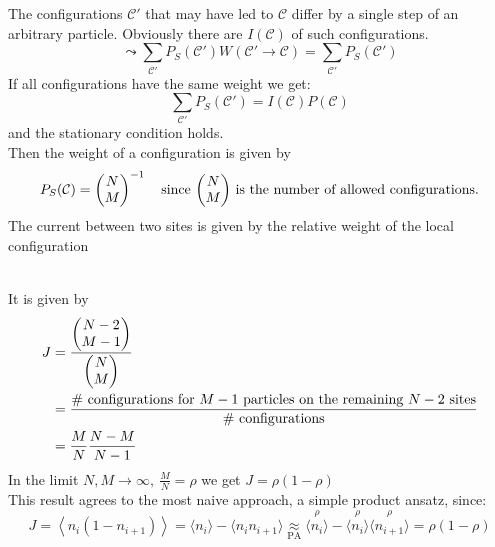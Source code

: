 The configurations $\mathcal{C}'$ that may have led to $\mathcal{C}$ differ by a single step of an arbitrary particle. Obviously there are $I(\mathcal{C})$ of such configurations.
\begin{equation*}
	\leadsto \sum\limits_{\mathcal{C}'}P_S(\mathcal{C}')W(\mathcal{C}'\to\mathcal{C})=\sum\limits_{\mathcal{C}'}P_S(\mathcal{C}')
\end{equation*}
If all configurations have the same weight we get:
\begin{equation*}
	\sum\limits_{\mathcal{C}'} P_S(\mathcal{C}') = I(\mathcal{C})P(\mathcal{C})
\end{equation*}
and the stationary condition holds.\\
Then the weight of a configuration is given by
\begin{equation*}
	P_S(\mathcal{C})=\begin{pmatrix} N\\ M\end{pmatrix}^{-1} \quad\text{since $\begin{pmatrix} N \\ M \end{pmatrix}$ is the number of allowed configurations.}
\end{equation*}
The current between two sites is given by the relative weight of the local configuration \\
It is given by
\begin{align*}
	J&=\frac{\begin{pmatrix} N-2 \\ M-1 \end{pmatrix}}{\begin{pmatrix} N\\ M \end{pmatrix}}\\
	&=\frac{\# \text{ configurations for $M-1$ particles on the remaining $N-2$ sites}}{\# \text{ configurations}}\\
	&=\frac{M}{N}\frac{N-M}{N-1}
\end{align*}
In the limit $N,M\to\infty,\ \frac{M}{N}=\rho$ we get $J=\rho(1-\rho)$\\
This result agrees to the most naive approach, a simple product ansatz, since:
\begin{equation*}
	J=\left\langle n_i(1-n_{i+1})\right\rangle = \langle n_i\rangle -\langle n_in_{i+1}\rangle\underset{\text{PA}}{\approx} \overset{\rho}{\langle n_i\rangle}-\overset{\rho}{\langle n_i\rangle}\overset{\rho}{\langle n_{i+1}\rangle}=\rho(1-\rho)
\end{equation*}
\textbf{\underline{}}\vspace{3mm}\\
